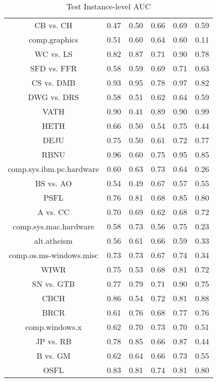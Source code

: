 \begin{table}[ht]\footnotesize
\centering
\caption{Test Instance-level AUC}
\label{Table:mil_test_instance_AUC}
\begin{tabular}{|c|c|c|c|c|c|}
  \hline
          &\MIB{}  &  \rB{}  &  \MB{}  &  \AB{}  &  \AuerB{}\\ 
  \hline
CB vs. CH  &  0.47   &  0.50   &  0.66   &  0.69   &  0.59 \\ 
comp.graphics  &  0.51   &  0.60   &  0.64   &  0.60   &  0.11 \\ 
WC vs. LS  &  0.82   &  0.87   &  0.71   &  0.90   &  0.78 \\ 
SFD vs. FFR  &  0.58   &  0.59   &  0.69   &  0.71   &  0.63 \\ 
CS vs. DMB  &  0.93   &  0.95   &  0.78   &  0.97   &  0.82 \\ 
DWG vs. DRS  &  0.58   &  0.51   &  0.62   &  0.64   &  0.59 \\ 
VATH  &  0.90   &  0.41   &  0.89   &  0.90   &  0.99 \\ 
HETH  &  0.66   &  0.50   &  0.54   &  0.75   &  0.44 \\ 
DEJU  &  0.75   &  0.50   &  0.61   &  0.72   &  0.77 \\ 
RBNU  &  0.96   &  0.60   &  0.75   &  0.95   &  0.85 \\ 
comp.sys.ibm.pc.hardware  &  0.60   &  0.63   &  0.73   &  0.64   &  0.26 \\ 
BS vs. AO  &  0.54   &  0.49   &  0.67   &  0.57   &  0.55 \\ 
PSFL  &  0.76   &  0.81   &  0.68   &  0.85   &  0.80 \\ 
A vs. CC  &  0.70   &  0.69   &  0.62   &  0.68   &  0.72 \\ 
comp.sys.mac.hardware  &  0.58   &  0.73   &  0.56   &  0.75   &  0.23 \\ 
alt.atheism  &  0.56   &  0.61   &  0.66   &  0.59   &  0.33 \\ 
comp.os.ms-windows.misc  &  0.73   &  0.73   &  0.67   &  0.74   &  0.34 \\ 
WIWR  &  0.75   &  0.53   &  0.68   &  0.81   &  0.72 \\ 
SN vs. GTB  &  0.77   &  0.79   &  0.71   &  0.90   &  0.75 \\ 
CBCH  &  0.86   &  0.54   &  0.72   &  0.81   &  0.88 \\ 
BRCR  &  0.61   &  0.76   &  0.68   &  0.77   &  0.76 \\ 
comp.windows.x  &  0.62   &  0.70   &  0.73   &  0.70   &  0.51 \\ 
JP vs. RB  &  0.78   &  0.85   &  0.66   &  0.87   &  0.44 \\ 
B vs. GM  &  0.62   &  0.64   &  0.66   &  0.73   &  0.55 \\ 
OSFL  &  0.83   &  0.81   &  0.74   &  0.81   &  0.80 \\ 
\hline
 \end{tabular}
  \end{table}


